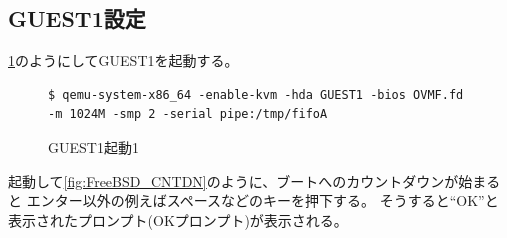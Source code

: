 \documentclass[a4j]{jarticle}
\begin{document}
\subsection{GUEST1設定}
\ref{fig:FreeBSD_guest1}のようにしてGUEST1を起動する。
\begin{figure}[htbp]
	\begin{center}
		\begin{lstlisting}[basicstyle=\ttfamily\footnotesize, frame=single, breaklines=true]
$ qemu-system-x86_64 -enable-kvm -hda GUEST1 -bios OVMF.fd -m 1024M -smp 2 -serial pipe:/tmp/fifoA
		\end{lstlisting}
	\end{center}
	\caption{GUEST1起動1}
	\label{fig:FreeBSD_guest1}
\end{figure}

起動して\ref{fig:FreeBSD_CNTDN}のように、ブートへのカウントダウンが始まると
エンター以外の例えばスペースなどのキーを押下する。
そうすると``OK''と表示されたプロンプト(OKプロンプト)が表示される。
\end{document}
